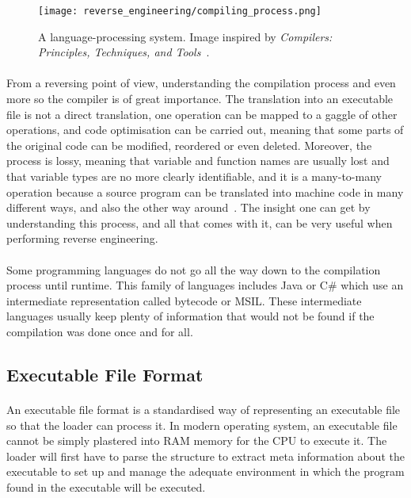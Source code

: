 \begin{figure}[!htb]
	\centering
	\texttt{[image: reverse\_engineering/compiling\_process.png]}
		\caption{A language-processing system. Image inspired by \textit{Compilers: Principles, Techniques, and Tools}~\cite{Aho:2006:CPT:1177220}.}
	\label{fig:compiling_process}
\end{figure}

\paragraph{}
From a reversing point of view, understanding the compilation process and even more so the compiler is of great importance. The translation into an executable file is not a direct translation, one operation can be mapped to a gaggle of other operations, and code optimisation can be carried out, meaning that some parts of the original code can be modified, reordered or even deleted. Moreover, the process is lossy, meaning that variable and function names are usually lost and that variable types are no more clearly identifiable, and it is a many-to-many operation because a source program can be translated into machine code in many different ways, and also the other way around~\cite{eagle2011ida}. The insight one can get by understanding this process, and all that comes with it, can be very useful when performing reverse engineering.

\paragraph{}
Some programming languages do not go all the way down to the compilation process until runtime. This family of languages includes Java or C\# which use an intermediate representation called bytecode or MSIL. These intermediate languages usually keep plenty of information that would not be found if the compilation was done once and for all.

\subsection{Executable File Format} \label{sec:executable_file_format}
\paragraph{}
An executable file format is a standardised way of representing an executable file so that the loader can process it. In modern operating system, an executable file cannot be simply plastered into RAM memory for the CPU to execute it. The loader will first have to parse the structure to extract meta information about the executable to set up and manage the adequate environment in which the program found in the executable will be executed.  

